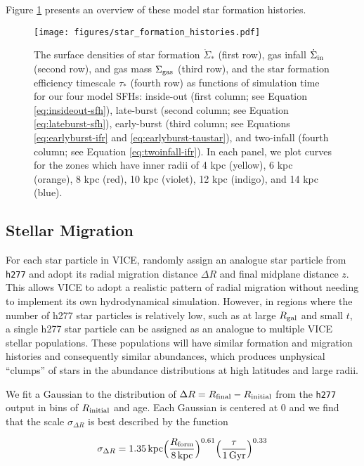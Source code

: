 \documentclass[twocolumn,linenumbers,twocolappendix]{aastex631}
\begin{document}
Figure \ref{fig:sfhs} presents an overview of these model star formation histories.

\begin{figure*}
    \centering
    \texttt{[image: figures/star\_formation\_histories.pdf]}
    \caption{The surface densities of star formation $\dot \Sigma_*$ (first row), gas infall $\dot \Sigma_{\rm in}$ (second row), and gas mass $\Sigma_{\rm gas}$ (third row), and the star formation efficiency timescale $\tau_*$ (fourth row) as functions of simulation time for our four model SFHs: inside-out (first column; see Equation \ref{eq:insideout-sfh}), late-burst (second column; see Equation \ref{eq:lateburst-sfh}), early-burst (third column; see Equations \ref{eq:earlyburst-ifr} and \ref{eq:earlyburst-taustar}), and two-infall (fourth column; see Equation \ref{eq:twoinfall-ifr}). In each panel, we plot curves for the zones which have inner radii of 4 kpc (yellow), 6 kpc (orange), 8 kpc (red), 10 kpc (violet), 12 kpc (indigo), and 14 kpc (blue).}
    \label{fig:sfhs}
\end{figure*}

\subsection{Stellar Migration}
\label{sec:migration}

For each star particle in VICE, \citet{Johnson2021-Migration} randomly assign an analogue star particle from \texttt{h277} and adopt its radial migration distance $\Delta R$ and final midplane distance $z$. This allows VICE to adopt a realistic pattern of radial migration without needing to implement its own hydrodynamical simulation. However, in regions where the number of h277 star particles is relatively low, such as at large $R_{\rm gal}$ and small $t$, a single h277 star particle can be assigned as an analogue to multiple VICE stellar populations. These populations will have similar formation and migration histories and consequently similar abundances, which produces unphysical ``clumps'' of stars in the abundance distributions at high latitudes and large radii. 

We fit a Gaussian to the distribution of $\Delta R = R_{\rm final} - R_{\rm initial}$ from the \texttt{h277} output in bins of $R_{\rm initial}$ and age. Each Gaussian is centered at 0 and we find that the scale $\sigma_{\Delta R}$ is best described by the function

\begin{equation}
    \sigma_{\Delta R} = 1.35\,{\rm kpc} \Big(\frac{R_{\rm form}}{8\,{\rm kpc}}\Big)^{0.61} \Big(\frac{\tau}{1\,{\rm Gyr}}\Big)^{0.33}
    \label{eq:radial-migration}
\end{equation}
\end{document}
